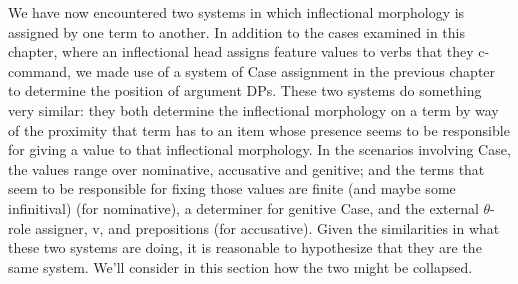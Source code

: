 We have now encountered two systems in which inflectional morphology is assigned by one term to another. In addition to the cases examined in this chapter, where an inflectional head assigns feature values to verbs that they c-command, we made use of a system of Case assignment in the previous chapter to determine the position of argument DPs. These two systems do something very similar: they both determine the inflectional morphology on a term by way of the proximity that term has to an item whose presence seems to be responsible for giving a value to that inflectional morphology. In the scenarios involving Case, the values range over nominative, accusative and genitive; and the terms that seem to be responsible for fixing those values are finite (and maybe some infinitival)  (for nominative), a determiner for genitive Case, and the external $\theta$-role assigner, v, and prepositions (for accusative). Given the similarities in what these two systems are doing, it is reasonable to hypothesize that they are the same system. We'll consider in this section how the two might be collapsed.

